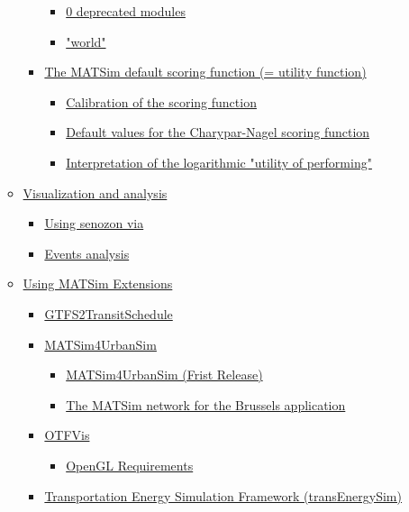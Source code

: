 \documentclass[a4paper,11pt]{report}
\begin{document}
\begin{itemize}
\begin{itemize}
\begin{itemize}
\begin{itemize}
	\item \href{http://www.matsim.org/node/508}{0 deprecated modules}
	\item \href{http://www.matsim.org/node/403}{"world"}
\end{itemize}
	\item \href{http://www.matsim.org/node/325}{The MATSim default scoring function (= utility function)}
\begin{itemize}
	\item \href{http://www.matsim.org/node/650}{Calibration of the scoring function}
	\item \href{http://www.matsim.org/node/708}{Default values for the Charypar-Nagel scoring function}
	\item \href{http://www.matsim.org/node/651}{Interpretation of the logarithmic "utility of performing"}
\end{itemize}
\end{itemize}
	\item \href{http://www.matsim.org/node/741}{Visualization and analysis}
\begin{itemize}
	\item \href{http://www.matsim.org/node/742}{Using senozon via}
	\item \href{http://www.matsim.org/node/743}{Events analysis}
\end{itemize}
	\item \href{http://www.matsim.org/docs/extensions}{Using MATSim Extensions}
\begin{itemize}
	\item \href{http://www.matsim.org/docs/extensions/gtfs2transitschedule}{GTFS2TransitSchedule}
	\item \href{http://www.matsim.org/docs/extensions/matism4urbansim}{MATSim4UrbanSim}
\begin{itemize}
	\item \href{http://www.matsim.org/node/733}{MATSim4UrbanSim (Frist Release)}
	\item \href{http://www.matsim.org/node/724}{The MATSim network for the Brussels application}
\end{itemize}
	\item \href{http://www.matsim.org/docs/extensions/otfvis}{OTFVis}
\begin{itemize}
	\item \href{http://www.matsim.org/docs/extensions/otfvis/opengl}{OpenGL Requirements}
\end{itemize}
	\item \href{http://www.matsim.org/docs/extensions/transEnergySim}{Transportation Energy Simulation Framework (transEnergySim)}

\end{itemize}
\end{itemize}
\end{itemize}
\end{document}
